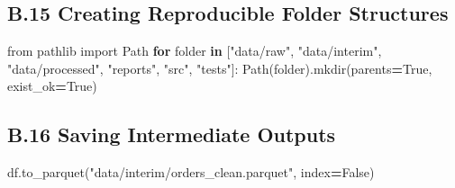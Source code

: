 \documentclass[
  12pt,
]{article}
\newenvironment{Shaded}{\begin{snugshade}}{\end{snugshade}}
\newcommand{\ControlFlowTok}[1]{\textcolor[rgb]{0.13,0.29,0.53}{\textbf{#1}}}
\newcommand{\DecValTok}[1]{\textcolor[rgb]{0.00,0.00,0.81}{#1}}
\newcommand{\ImportTok}[1]{#1}
\newcommand{\KeywordTok}[1]{\textcolor[rgb]{0.13,0.29,0.53}{\textbf{#1}}}
\newcommand{\NormalTok}[1]{#1}
\newcommand{\OperatorTok}[1]{\textcolor[rgb]{0.81,0.36,0.00}{\textbf{#1}}}
\newcommand{\StringTok}[1]{\textcolor[rgb]{0.31,0.60,0.02}{#1}}
\newcommand{\VariableTok}[1]{\textcolor[rgb]{0.00,0.00,0.00}{#1}}
\begin{document}
\begin{Shaded}
\end{Shaded}

\subsection{B.15 Creating Reproducible Folder
Structures}\label{b.15-creating-reproducible-folder-structures}

\begin{Shaded}
\begin{Highlighting}[]
\ImportTok{from}\NormalTok{ pathlib }\ImportTok{import}\NormalTok{ Path}
\ControlFlowTok{for}\NormalTok{ folder }\KeywordTok{in}\NormalTok{ [}\StringTok{"data/raw"}\NormalTok{, }\StringTok{"data/interim"}\NormalTok{, }\StringTok{"data/processed"}\NormalTok{, }\StringTok{"reports"}\NormalTok{, }\StringTok{"src"}\NormalTok{, }\StringTok{"tests"}\NormalTok{]:}
\NormalTok{    Path(folder).mkdir(parents}\OperatorTok{=}\VariableTok{True}\NormalTok{, exist\_ok}\OperatorTok{=}\VariableTok{True}\NormalTok{)}
\end{Highlighting}
\end{Shaded}

\subsection{B.16 Saving Intermediate
Outputs}\label{b.16-saving-intermediate-outputs}

\begin{Shaded}
\begin{Highlighting}[]
\NormalTok{df.to\_parquet(}\StringTok{"data/interim/orders\_clean.parquet"}\NormalTok{, index}\OperatorTok{=}\VariableTok{False}\NormalTok{)}
\end{Highlighting}
\end{Shaded}
\end{document}
